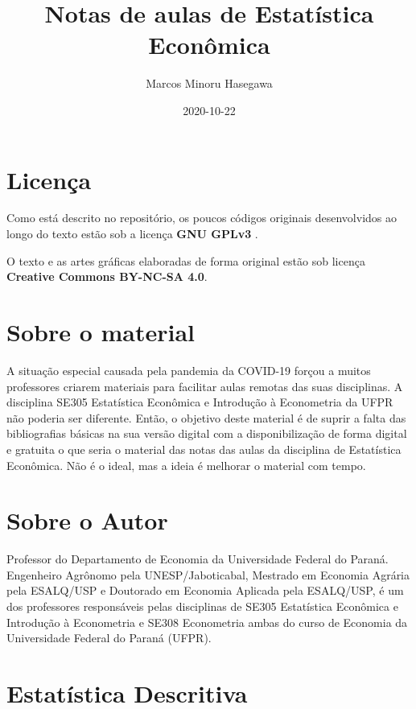 \documentclass[
]{book}
\title{Notas de aulas de Estatística Econômica}
\author{Marcos Minoru Hasegawa}
\date{2020-10-22}
\begin{document}
\maketitle

{
\setcounter{tocdepth}{1}
\tableofcontents
}
\hypertarget{licenuxe7a}{%
\chapter*{Licença}\label{licenuxe7a}}

Como está descrito no repositório, os poucos códigos originais desenvolvidos ao longo do texto estão sob a licença \textbf{GNU GPLv3} .

O texto e as artes gráficas elaboradas de forma original estão sob licença \textbf{Creative Commons BY-NC-SA 4.0}.

\hypertarget{sobre-o-material}{%
\chapter*{Sobre o material}\label{sobre-o-material}}

A situação especial causada pela pandemia da COVID-19 forçou a muitos professores criarem materiais para facilitar aulas remotas das suas disciplinas. A disciplina SE305 Estatística Econômica e Introdução à Econometria da UFPR não poderia ser diferente. Então, o objetivo deste material é de suprir a falta das bibliografias básicas na sua versão digital com a disponibilização de forma digital e gratuita o que seria o material das notas das aulas da disciplina de Estatística Econômica. Não é o ideal, mas a ideia é melhorar o material com tempo.

\hypertarget{sobre-o-autor}{%
\chapter*{Sobre o Autor}\label{sobre-o-autor}}

Professor do Departamento de Economia da Universidade Federal do Paraná. Engenheiro Agrônomo pela UNESP/Jaboticabal, Mestrado em Economia Agrária pela ESALQ/USP e Doutorado em Economia Aplicada pela ESALQ/USP, é um dos professores responsáveis pelas disciplinas de SE305 Estatística Econômica e Introdução à Econometria e SE308 Econometria ambas do curso de Economia da Universidade Federal do Paraná (UFPR).

\hypertarget{estatuxedstica-descritiva}{%
\chapter{Estatística Descritiva}\label{estatuxedstica-descritiva}}
\end{document}
